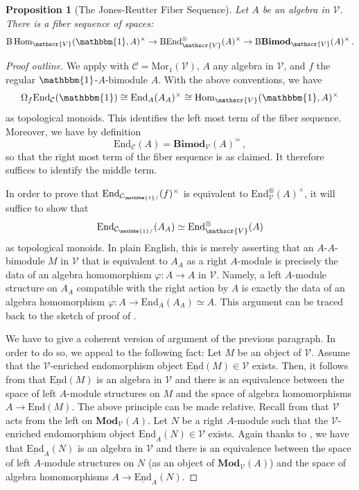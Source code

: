 \documentclass[11pt,reqno]{amsart}
\numberwithin{equation}{section}
\theoremstyle{plain}
\newtheorem{prop}[equation]{Proposition}
\theoremstyle{definition}
\begin{document}
\begin{prop}[The Jones-Reutter Fiber Sequence]\label{prop:JonesReutter}
Let $A$ be an algebra in $\mathscr{V}$. There is a fiber sequence of spaces:
$$\mathrm{B}\,\mathrm{Hom}_{\mathscr{V}}(\mathbbm{1},A)^{\times}
\rightarrow\mathrm{B}\mathrm{End}^{\otimes}_{\mathscr{V}}(A)^{\times}\rightarrow \mathrm{B}\mathbf{Bimod}_{\mathscr{V}}(A)^{\times}\,.$$
\end{prop}
\begin{proof}[Proof outline]
We apply  with $\mathcal{C}=\mathrm{Mor}_1(\mathscr{V})$, $A$ any algebra in $\mathscr{V}$, and $f$ the regular $\mathbbm{1}$-$A$-bimodule $A$.
With the above conventions, we have $$\Omega_f\mathrm{End}_{\mathcal{C}}(\mathbbm{1}) \cong \mathrm{End}_A(A_A)^{\times}\cong \mathrm{Hom}_{\mathscr{V}}(\mathbbm{1},A)^{\times}$$
as topological monoids.
This identifies the left most term of the fiber sequence.
Moreover, we have by definition 
$$\mathrm{End}_{\mathcal{C}}(A) = \mathbf{Bimod}_{\mathscr{V}}(A)^{\simeq}\,,$$
so that the right most term of the fiber sequence is as claimed.
It therefore suffices to identify the middle term.

In order to prove that $\mathrm{End}_{\mathcal{C}_{\mathbbm{1}/}}(f)^{\times}$ is equivalent to $\mathrm{End}^{\otimes}_{\mathscr{V}}(A)^{\times}$, it will suffice to show that
$$\mathrm{End}_{\mathcal{C}_{\mathbbm{1}/}}(A_A)\simeq\mathrm{End}^{\otimes}_{\mathscr{V}}(A)$$
as topological monoids.
In plain English, this is merely asserting that an $A$-$A$-bimodule $M$ in $\mathscr{V}$ that is equivalent to $A_A$ as a right $A$-module is precisely the data of an algebra homomorphism $\varphi:A\rightarrow A$ in $\mathscr{V}$.
Namely, a left $A$-module structure on $A_A$ compatible with the right action by $A$ is exactly the data of an algebra homomorphism $\varphi:A\rightarrow\mathrm{End}_A(A_A)\simeq A$. This argument can be traced back to the sketch of proof of \cite[Proposition 2.3.2]{JF2}.

We have to give a coherent version of argument of the previous paragraph.
In order to do so, we appeal to the following fact:
Let $M$ be an object of $\mathscr{V}$.
Assume that the $\mathscr{V}$-enriched endomorphism object $\underline{\mathrm{End}}(M)\in\mathscr{V}$ exists.
Then, it follows from \cite[Theorem 4.7.1.34]{HA} that $\underline{\mathrm{End}}(M)$ is an algebra in $\mathscr{V}$ and there is an equivalence between the space of left $A$-module structures on $M$ and the space of algebra homomorphisms $A\rightarrow\underline{\mathrm{End}}(M)$.
The above principle can be made relative.
Recall from \cite[Proposition 4.3.2.5]{HA} that $\mathscr{V}$ acts from the left on $\mathbf{Mod}_{\mathscr{V}}(A)$.
Let $N$ be a right $A$-module such that the $\mathscr{V}$-enriched endomorphism object $\underline{\mathrm{End}}_A(N)\in\mathscr{V}$ exists.
Again thanks to \cite[Theorem 4.7.1.34]{HA}, we have that $\underline{\mathrm{End}}_A(N)$ is an algebra in $\mathscr{V}$ and there is an equivalence between the space of left $A$-module structures on $N$ (as an object of $\mathbf{Mod}_{\mathscr{V}}(A)$) and the space of algebra homomorphisms $A\rightarrow\underline{\mathrm{End}}_A(N)$.


\end{proof}
\end{document}
